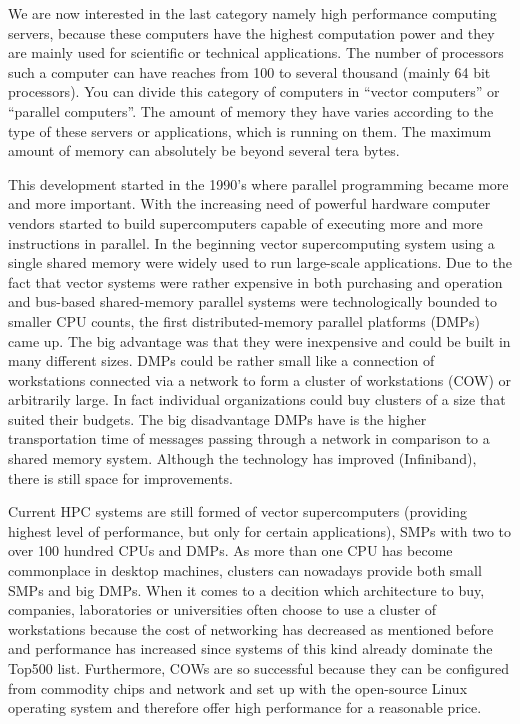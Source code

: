 We are now interested in the last category namely high performance
computing servers, because these computers have the highest
computation power and they are mainly used
for scientific or technical applications. The number of processors
such a computer can have reaches from 100 to several thousand (mainly
64 bit processors).
You can divide this category of computers in ``vector computers'' or ``parallel
computers''. The amount of memory they have varies according to the type of
these servers or applications, which is running on them. The maximum
amount of memory can absolutely be beyond several tera bytes.  

This development started in the 1990's where parallel programming 
became more and more important. With the increasing need of powerful
hardware computer vendors started to build supercomputers capable of
executing more and more instructions in parallel. In the beginning
vector supercomputing system using a single shared memory were widely
used to run large-scale applications. Due to the fact that vector
systems were rather expensive in both purchasing and operation and
bus-based shared-memory parallel systems were technologically bounded
to smaller CPU counts, the first distributed-memory parallel platforms (DMPs)
came up. The big advantage was that they were inexpensive and could be
built in many different sizes. DMPs could be rather small like a
connection of workstations connected via a network to form a cluster of
workstations (COW) or arbitrarily large. In fact individual
organizations could buy clusters of a size that suited their
budgets. The big disadvantage DMPs have is the higher transportation
time of messages passing through a network in comparison to a shared
memory system. Although the technology has improved (Infiniband), there
is still space for improvements. 

Current HPC systems are still formed of vector supercomputers
(providing highest level of performance, but only for certain
applications), SMPs with two to over 100 hundred CPUs and DMPs. As
more than one CPU has become commonplace in desktop machines, clusters
can nowadays provide both small SMPs and big DMPs. When it comes to a
decition which architecture to buy, companies, laboratories or
universities often choose to use a cluster of workstations because the
cost of networking has decreased as mentioned before and performance
has increased since systems of this kind already dominate the Top500
list. Furthermore, COWs are so successful because they can be
configured from commodity chips and network and set up with the open-source
Linux operating system and therefore offer high performance for a
reasonable price.

